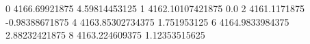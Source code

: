 0 4166.69921875 4.59814453125
1 4162.10107421875 0.0
2 4161.1171875 -0.98388671875
4 4163.85302734375 1.751953125
6 4164.9833984375 2.88232421875
8 4163.224609375 1.12353515625
